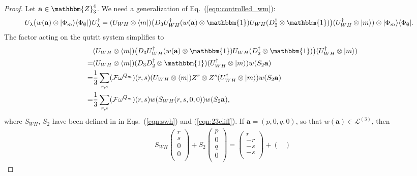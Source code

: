 \documentclass[aps,nofootinbib,floatfix,a4paper]{revtex4}
\newcommand{\1}{\mbox{$\mathbf{1}$}}
\def\ZZ{\mathbbm{Z}}
\def\F{\mathcal{F}}
\def\Id{\mathbbm{1}}
\renewcommand{\vec}{\mathbf}
\begin{document}
\begin{proof}
	Let $\vec a \in\ZZ_3^4$.
	We need a generalization of Eq.~(\ref{eqn:controlled_wm}):
	\begin{align*}
		U_\lambda
		\big(
			w(\vec a)
			\otimes |\Phi_m\rangle\langle\Phi_\emptyset|
		\big)
		U_\lambda^\dagger
		&=
		(U_{WH}\otimes \langle m|) \big(
			D_3 U_{WH}^\dagger (w(\vec a) \otimes \Id) U_{WH} (D_2^\dagger\otimes \Id)
		\big)
		(U_{WH}^\dagger\otimes|m\rangle)
			\otimes |\Phi_m\rangle\langle\Phi_\emptyset|.
	\end{align*}
	The factor acting on the qutrit system simplifies to
	\begin{align*}
		&
		(U_{WH}\otimes \langle m|) \big(
			D_3 U_{WH}^\dagger (w(\vec a) \otimes \Id) U_{WH} (D_2^\dagger\otimes \Id)
		\big)
		(U_{WH}^\dagger\otimes|m\rangle)
		\nonumber \\
		=&
		(U_{WH}\otimes \langle m|) 
			(D_3 D_2^\dagger\otimes \Id)
		(U_{WH}^\dagger\otimes|m\rangle) 
		w(S_2 \vec a)
		\nonumber \\
		=&
		\frac1{3}
		\sum_{r,s}
		(\F \omega^{Q_m})(r,s)
		(U_{WH}\otimes \langle m|) 
			Z^r\otimes Z^s
		(U_{WH}^\dagger\otimes|m\rangle) 
			w(S_2 \vec a)
		\nonumber 
			\\
		=&
		\frac1{3}
		\sum_{r,s}
		(\F \omega^{Q_m})(r,s)
		w(S_{WH} (r,s,0,0)) w(S_2 \vec a)
		,
	\end{align*}
	where $S_{WH}$, $S_2$ have been defined in in Eqs.~(\ref{eqn:swh}) and (\ref{eqn:23cliff}).
	If $\vec a = (p,0,q,0)$, so that $w(\vec a) \in \mathcal{L}^{(3)}$, then
	\begin{align*}
		S_{WH} 
		\begin{pmatrix}
			r\\
			s\\
			0\\
			0\\
		\end{pmatrix}
		+
		S_2 
		\begin{pmatrix}
			p\\
			0\\
			q\\
			0\\
		\end{pmatrix}
		=
		\begin{pmatrix}
			r\\
			-r\\
			-s\\
			-s\\
		\end{pmatrix}
		+
		\begin{pmatrix}

\end{pmatrix}
\end{align*}
\end{proof}
\end{document}

